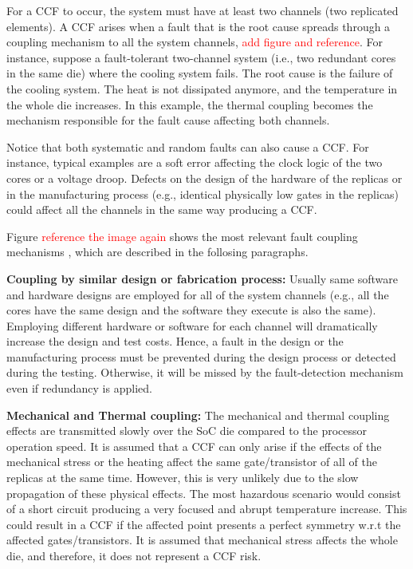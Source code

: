 For a CCF to occur, the system must have at least two channels (two replicated elements). A CCF arises when a fault that is the root cause spreads through a coupling mechanism to all the system channels, \textcolor{red}{add figure and reference}. For instance, suppose a fault-tolerant two-channel system (i.e., two redundant cores in the same die) where the cooling system fails. The root cause is the failure of the cooling system. The heat is not dissipated anymore, and the temperature in the whole die increases. In this example, the thermal coupling becomes the mechanism responsible for the fault cause affecting both channels.

Notice that both systematic and random faults can also cause a CCF. For instance, typical examples are a soft error affecting the clock logic of the two cores or a voltage droop. Defects on the design of the hardware of the replicas or in the manufacturing process (e.g., identical physically low gates in the replicas) could affect all the channels in the same way producing a CCF.

Figure \textcolor{red}{reference the image again} shows the most relevant fault coupling mechanisms \cite{Tummeltshammer2009}, which are described in the follosing paragraphs. 

\textbf{Coupling by similar design or fabrication process:} Usually same software and hardware designs are employed for all of the system channels (e.g., all the cores have the same design and the software they execute is also the same). Employing different hardware or software for each channel will dramatically increase the design and test costs. Hence, a fault in the design or the manufacturing process must be prevented during the design process or detected during the testing. Otherwise, it will be missed by the fault-detection mechanism even if redundancy is applied. 

\textbf{Mechanical and Thermal coupling:} The mechanical and thermal coupling effects are transmitted slowly over the SoC die compared to the processor operation speed. It is assumed that a CCF can only arise if the effects of the mechanical stress or the heating affect the same gate/transistor of all of the replicas at the same time. However, this is very unlikely due to the slow propagation of these physical effects. The most hazardous scenario would consist of a short circuit producing a very focused and abrupt temperature increase. This could result in a CCF if the affected point presents a perfect symmetry w.r.t the affected gates/transistors. It is assumed that mechanical stress affects the whole die, and therefore, it does not represent a CCF risk. 

